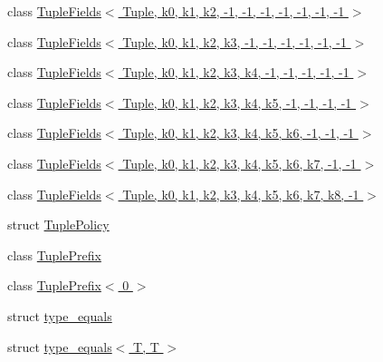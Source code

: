 \begin{DoxyCompactItemize}
\item 
class \hyperlink{classtesting_1_1internal_1_1TupleFields_3_01Tuple_00_01k0_00_01k1_00_01k2_00_01-1_00_01-1_00_01-d40fb0064dd627afc9c2b7f6513ffcb3}{Tuple\+Fields$<$ Tuple, k0, k1, k2, -\/1, -\/1, -\/1, -\/1, -\/1, -\/1, -\/1 $>$}
\item 
class \hyperlink{classtesting_1_1internal_1_1TupleFields_3_01Tuple_00_01k0_00_01k1_00_01k2_00_01k3_00_01-1_00_01-5ce285d726b58f03354f318c4712939e}{Tuple\+Fields$<$ Tuple, k0, k1, k2, k3, -\/1, -\/1, -\/1, -\/1, -\/1, -\/1 $>$}
\item 
class \hyperlink{classtesting_1_1internal_1_1TupleFields_3_01Tuple_00_01k0_00_01k1_00_01k2_00_01k3_00_01k4_00_01-111caa1fee55a41736499c292bb1a612}{Tuple\+Fields$<$ Tuple, k0, k1, k2, k3, k4, -\/1, -\/1, -\/1, -\/1, -\/1 $>$}
\item 
class \hyperlink{classtesting_1_1internal_1_1TupleFields_3_01Tuple_00_01k0_00_01k1_00_01k2_00_01k3_00_01k4_00_01k15c11b8436218f7eb1523adb30f3f284}{Tuple\+Fields$<$ Tuple, k0, k1, k2, k3, k4, k5, -\/1, -\/1, -\/1, -\/1 $>$}
\item 
class \hyperlink{classtesting_1_1internal_1_1TupleFields_3_01Tuple_00_01k0_00_01k1_00_01k2_00_01k3_00_01k4_00_01keabdf503bd0192bc35ddb795df95316f}{Tuple\+Fields$<$ Tuple, k0, k1, k2, k3, k4, k5, k6, -\/1, -\/1, -\/1 $>$}
\item 
class \hyperlink{classtesting_1_1internal_1_1TupleFields_3_01Tuple_00_01k0_00_01k1_00_01k2_00_01k3_00_01k4_00_01kb66bdb5aa3faae197a495470a1b8e9d1}{Tuple\+Fields$<$ Tuple, k0, k1, k2, k3, k4, k5, k6, k7, -\/1, -\/1 $>$}
\item 
class \hyperlink{classtesting_1_1internal_1_1TupleFields_3_01Tuple_00_01k0_00_01k1_00_01k2_00_01k3_00_01k4_00_01k478398ee7a3c50306b8ce1483964573e}{Tuple\+Fields$<$ Tuple, k0, k1, k2, k3, k4, k5, k6, k7, k8, -\/1 $>$}
\item 
struct \hyperlink{structtesting_1_1internal_1_1TuplePolicy}{Tuple\+Policy}
\item 
class \hyperlink{classtesting_1_1internal_1_1TuplePrefix}{Tuple\+Prefix}
\item 
class \hyperlink{classtesting_1_1internal_1_1TuplePrefix_3_010_01_4}{Tuple\+Prefix$<$ 0 $>$}
\item 
struct \hyperlink{structtesting_1_1internal_1_1type__equals}{type\+\_\+equals}
\item 
struct \hyperlink{structtesting_1_1internal_1_1type__equals_3_01T_00_01T_01_4}{type\+\_\+equals$<$ T, T $>$}
\item 

\end{DoxyCompactItemize}
